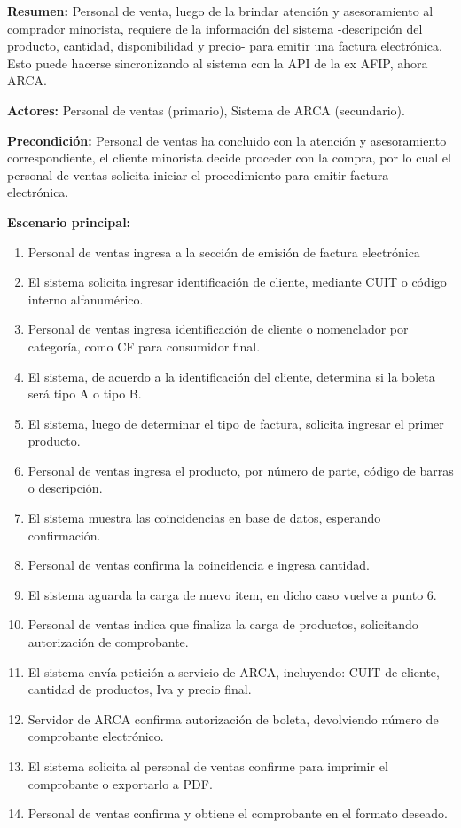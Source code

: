 \documentclass[11pt]{article}
\begin{document}
\textbf{Resumen:}
Personal de venta, 
luego de la brindar atención y asesoramiento al comprador minorista,
requiere de la información del sistema
-descripción del producto, cantidad, disponibilidad y precio-
para emitir una factura electrónica.
Esto puede hacerse sincronizando al sistema con la API de la ex AFIP,
ahora ARCA.

\textbf{Actores:} Personal de ventas (primario), Sistema de ARCA (secundario).

\textbf{Precondición:} 
Personal de ventas ha concluido con la atención y asesoramiento correspondiente,
el cliente minorista decide proceder con la compra,
por lo cual el personal de ventas solicita iniciar el procedimiento para emitir factura electrónica.

\textbf{Escenario principal:}
\begin{enumerate}
	\item Personal de ventas ingresa a la sección de emisión de factura electrónica
	\item El sistema solicita ingresar identificación de cliente, mediante CUIT o código interno alfanumérico.
	\item Personal de ventas ingresa identificación de cliente o nomenclador por categoría, como CF para consumidor final.
	\item El sistema, de acuerdo a la identificación del cliente, determina si la boleta será tipo A o tipo B.
	\item El sistema, luego de determinar el tipo de factura, solicita ingresar el primer producto.
	\item Personal de ventas ingresa el producto, por número de parte, código de barras o descripción.
	\item El sistema muestra las coincidencias en base de datos, esperando confirmación.
	\item Personal de ventas confirma la coincidencia e ingresa cantidad.
	\item El sistema aguarda la carga de nuevo item, en dicho caso vuelve a punto 6.
	\item Personal de ventas indica que finaliza la carga de productos, solicitando autorización de comprobante.
	\item El sistema envía petición a servicio de ARCA, incluyendo: CUIT de cliente, cantidad de productos, Iva y precio final.
	\item Servidor de ARCA confirma autorización de boleta, devolviendo número de comprobante electrónico.
	\item El sistema solicita al personal de ventas confirme para imprimir el comprobante o exportarlo a PDF.
	\item Personal de ventas confirma y obtiene el comprobante en el formato deseado.
\end{enumerate}
\end{document}
